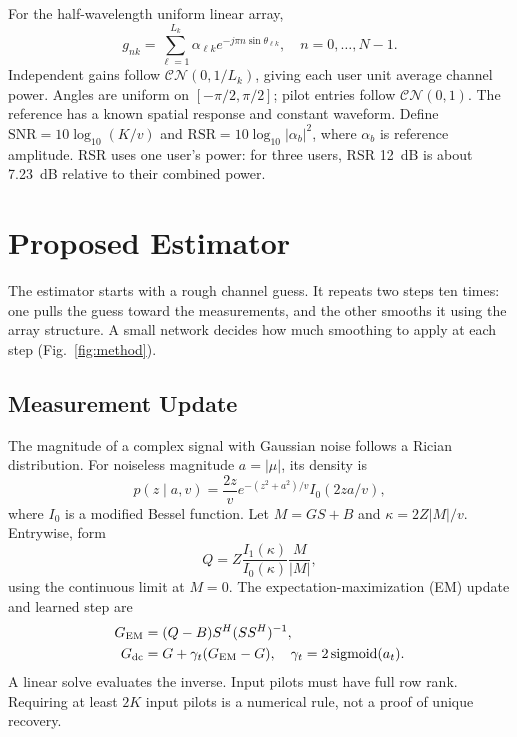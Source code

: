 \documentclass[journal]{IEEEtran}
\newcommand{\CN}{\mathcal{CN}}
\DeclareMathOperator{\sigmoid}{sigmoid}
\begin{document}
For the half-wavelength uniform linear array,
\begin{equation}
 g_{nk}=\sum_{\ell=1}^{L_k}\alpha_{\ell k}e^{-j\pi n\sin\theta_{\ell k}},
 \quad n=0,\ldots,N-1.
\end{equation}
Independent gains follow $\CN(0,1/L_k)$, giving each user unit average
channel power. Angles are uniform on $[-\pi/2,\pi/2]$; pilot entries
follow $\CN(0,1)$. The reference has a known spatial response and constant waveform. Define
$\mathrm{SNR}=10\log_{10}(K/v)$ and
$\mathrm{RSR}=10\log_{10}|\alpha_b|^2$, where $\alpha_b$ is reference
amplitude. RSR uses one user's power: for three users, RSR 12~dB is
about 7.23~dB relative to their combined power.

\section{Proposed Estimator}
The estimator starts with a rough channel guess. It repeats two steps ten
times: one pulls the guess toward the measurements, and the other smooths
it using the array structure. A small network decides how much smoothing
to apply at each step (Fig.~\ref{fig:method}).

\subsection{Measurement Update}
The magnitude of a complex signal with Gaussian noise follows a Rician
distribution. For noiseless magnitude $a=|\mu|$, its density is
\begin{equation}
 p(z\mid a,v)=\frac{2z}{v}e^{-(z^2+a^2)/v}I_0(2za/v),
\end{equation}
where $I_0$ is a modified Bessel function. Let $M=GS+B$ and
$\kappa=2Z|M|/v$. Entrywise, form
\begin{equation}
 Q=Z\frac{I_1(\kappa)}{I_0(\kappa)}\frac{M}{|M|},
\end{equation}
using the continuous limit at $M=0$. The expectation-maximization (EM)
update and learned step are
\begin{align}
 G_{\rm EM}&=(Q-B)S^H(SS^H)^{-1},\\
 G_{\rm dc}&=G+\gamma_t(G_{\rm EM}-G),\quad
 \gamma_t=2\sigmoid(a_t).
\end{align}
A linear solve evaluates the inverse. Input pilots must have full row
rank. Requiring at least $2K$ input pilots is a numerical rule, not a
proof of unique recovery.
\end{document}
